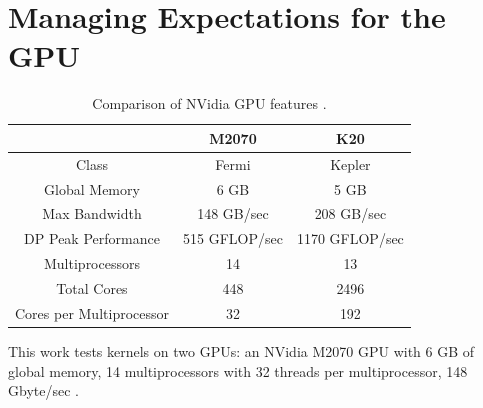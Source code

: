 \documentclass{report}
\begin{document}
%

\section{Managing Expectations for the GPU}

\begin{table}[h]
\centering
\caption{Comparison of NVidia GPU features \cite{M2070FactSheet,KeplerFactSheet}.}
\label{tbl:gpu_comparison}
\begin{tabular}{c|c|c}
 & M2070  & K20 \\ \hline
Class & Fermi & Kepler \\ \hline
Global Memory & 6 GB & 5 GB \\ 
Max Bandwidth & 148 GB/sec & 208 GB/sec \\ 
DP Peak Performance & 515 GFLOP/sec & 1170 GFLOP/sec \\ 
Multiprocessors & 14 & 13 \\ 
Total Cores & 448 & 2496 \\ 
Cores per Multiprocessor & 32 & 192 \\ \hline
\end{tabular}
\end{table}


This work tests kernels on two GPUs: an NVidia M2070 GPU with 6 GB of global memory, 14 multiprocessors with 32 threads per multiprocessor,  148 Gbyte/sec . 
\end{document}
